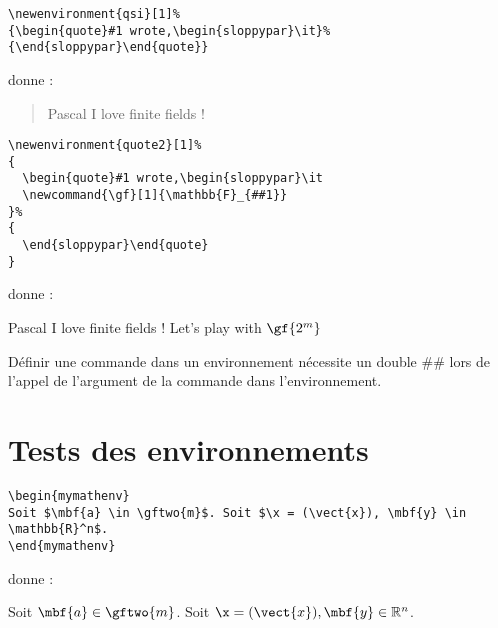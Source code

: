 \bigskip
\begin{verbatim}
\newenvironment{qsi}[1]%
{\begin{quote}#1 wrote,\begin{sloppypar}\it}%
{\end{sloppypar}\end{quote}}
\end{verbatim}
donne :\\
\begin{quote}{Pascal}
I love finite fields !
\end{quote}




\begin{verbatim}
\newenvironment{quote2}[1]%
{
  \begin{quote}#1 wrote,\begin{sloppypar}\it
  \newcommand{\gf}[1]{\mathbb{F}_{##1}}
}%
{
  \end{sloppypar}\end{quote}
}
\end{verbatim}
donne :\\
\begin{quote2}{Pascal}
I love finite fields ! Let's play with $\gf{2^m}$
\end{quote2}


Définir une commande dans un environnement nécessite un double \#\# lors de l'appel de l'argument de la commande dans l'environnement.

\section{Tests des environnements}

\begin{verbatim}
\begin{mymathenv}
Soit $\mbf{a} \in \gftwo{m}$. Soit $\x = (\vect{x}), \mbf{y} \in \mathbb{R}^n$.
\end{mymathenv}
\end{verbatim}
donne :\\
\begin{mymathenv}
Soit $\mbf{a} \in \gftwo{m}$. Soit $\x = (\vect{x}), \mbf{y} \in \mathbb{R}^n$.
\end{mymathenv}